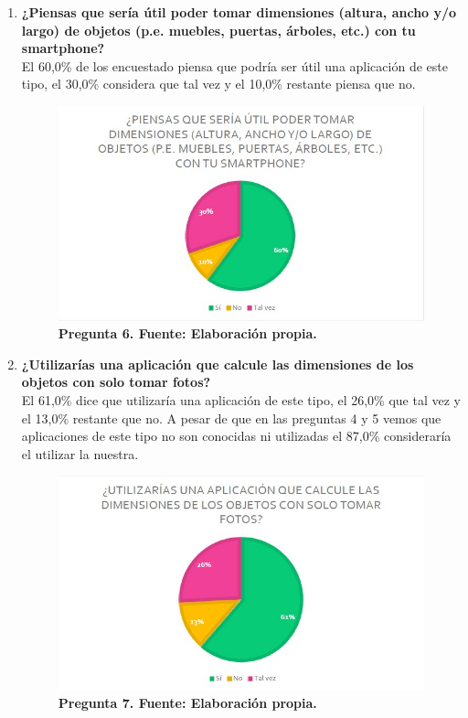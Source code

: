 \begin{enumerate}
	    \item \textbf{¿Piensas que sería útil poder tomar dimensiones (altura, ancho y/o largo) de objetos (p.e. muebles, puertas, árboles, etc.) con tu smartphone?}\\
	    El 60,0\% de los encuestado piensa que podría ser útil una aplicación de este tipo, el 30,0\% considera que tal vez y el 10,0\% restante piensa que no.
	    \begin{figure}[h!]
	        \centering	            
	        \includegraphics[width=15.5cm]{IMG/Graficas/4}
	            \caption{ \textbf{Pregunta 6. Fuente: Elaboración propia.}}
	            \label{fig:edomercado4}
	\end{figure}
	\newpage
	
	    \item \textbf{¿Utilizarías una aplicación que calcule las dimensiones de los objetos con solo tomar fotos?}\\
	    El 61,0\% dice que utilizaría una aplicación de este tipo, el 26,0\% que tal vez y el 13,0\% restante que no. A pesar de que en las preguntas 4 y 5 vemos que aplicaciones de este tipo no son conocidas ni utilizadas el 87,0\% consideraría el utilizar la nuestra.
	    \begin{figure}[h!]
	        \centering	            
	        \includegraphics[width=15.5cm]{IMG/Graficas/5}
	            \caption{ \textbf{Pregunta 7. Fuente: Elaboración propia.}}
	            \label{fig:edomercado5}
	\end{figure}
	

\end{enumerate}
